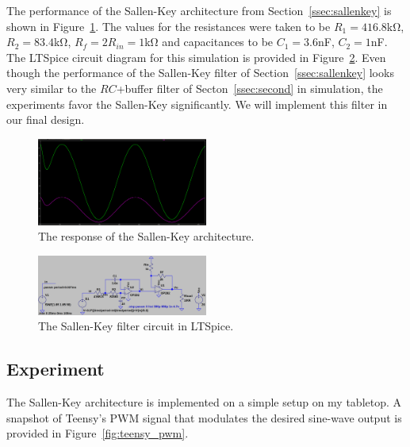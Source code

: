 The performance of the Sallen-Key architecture from Section~\ref{ssec:sallenkey}
is shown in Figure~\ref{fig:sallenkey_response}. The values for the
resistances were taken to be $R_1 = 416.8$\unit{\kilo\ohm}, $R_2 = 83.4$\unit{\kilo\ohm}, $R_f
= 2R_{in} = 1$\unit{\kilo\ohm} and capacitances to be $C_1 =
3.6$\unit{\nano\farad}, $C_2 = 1$\unit{\nano\farad}. The LTSpice circuit diagram
for this simulation is provided in Figure~\ref{fig:sallenkey_circuit}. Even
though the performance of the Sallen-Key filter of Section~\ref{ssec:sallenkey}
looks very similar to the $RC$+buffer filter of Secton~\ref{ssec:second} in
simulation, the experiments favor the Sallen-Key significantly. We will
implement this filter in our final design. 
%
\begin{figure}[tbh]
\includegraphics[width=0.5\textwidth]{./figures/sallenkey_response.png}
\caption{The response of the Sallen-Key architecture.}
\label{fig:sallenkey_response}
\end{figure}
%
\begin{figure}[tbh]
\includegraphics[width=0.5\textwidth]{./figures/sallenkey_circuit.png}
\caption{The Sallen-Key filter circuit in LTSpice.}
\label{fig:sallenkey_circuit}
\end{figure}


\vspace{-1em}
\subsection{Experiment}
\vspace{-1em}

The Sallen-Key architecture is implemented on a simple setup on my tabletop.
A snapshot of Teensy's PWM signal that modulates the desired sine-wave output is
provided in Figure~\ref{fig:teensy_pwm}.



